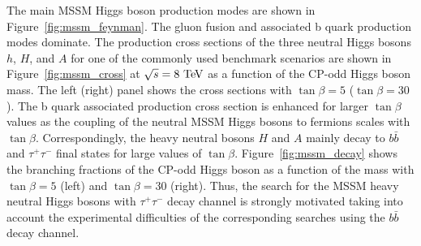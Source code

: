 The main MSSM Higgs boson production modes are shown in Figure~\ref{fig:mssm_feynman}. The gluon fusion and associated b quark production modes dominate. The production cross sections of the three neutral Higgs bosons $h$, $H$, and $A$ for one of the commonly used benchmark scenarios are shown in Figure~\ref{fig:mssm_cross} at $\sqrt{s}=8~\mathrm{Te\kern -0.1em V}$ as a function of the CP-odd Higgs boson mass. The left (right) panel shows the cross sections with $\tan \beta = 5$ ($\tan \beta =30$).  The b quark associated production cross section is enhanced for larger $\tan \beta$ values as the coupling of the neutral MSSM Higgs bosons to fermions scales with $\tan \beta$. Correspondingly, the heavy neutral bosons $H$ and $A$ mainly decay to $b\bar{b}$ and $\tau^{+}\tau^{-}$ final states for large values of $\tan \beta$. Figure~\ref{fig:mssm_decay} shows the branching fractions of the CP-odd Higgs boson as a function of the mass with $\tan \beta=5$ (left) and $\tan \beta=30$ (right). Thus, the search for the MSSM heavy neutral Higgs bosons with $\tau^{+}\tau^{-}$ decay channel is strongly motivated taking into account the experimental difficulties of the corresponding searches using the $b\bar{b}$ decay channel.